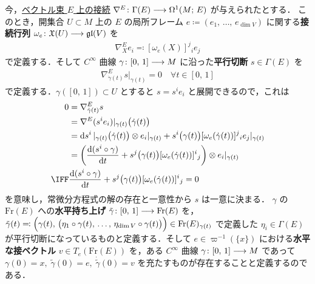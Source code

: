 \documentclass[TQFT_main]{subfiles}
\begin{document}
今，\hyperref[def:connection-vect]{ベクトル束 $E$ 上の接続} $\nabla^E \colon \Gamma(E) \longrightarrow \Omega^1(M;\, E)$ が与えられたとする．
このとき，開集合 $U \subset M$ 上の $E$ の局所フレーム $e \coloneqq (e_1,\, \dots,\, e_{\dim V})$ に関する\textbf{接続行列} $\omega_e \colon \mathfrak{X}(U) \longrightarrow \mathfrak{gl}(V)$ を
\begin{align}
    \nabla^E_{X} e_i \eqqcolon [\omega_e (X)]^j{}_i e_j
\end{align}
で定義する．そして $C^\infty$ 曲線 $\gamma \colon [0,\, 1] \longrightarrow M$ に沿った\textbf{平行切断} $s \in \Gamma(E)$ を
\begin{align}
    \nabla^E_{\dot{\gamma}(t)} s|_{\gamma(t)} = 0 \quad \forall t \in [0,\, 1]
\end{align}
で定義する．$\gamma([0,\, 1]) \subset U$ とすると $s = s^i e_i$ と展開できるので，これは
\begin{align}
    0 &= \nabla^E_{\dot{\gamma}(t)} s \\
    &= \nabla^E (s^ie_i)|_{\gamma(t)} \bigl( \dot{\gamma}(t) \bigr) \\
    &= \dd{s^i}|_{\gamma(t)}\bigl( \dot{\gamma}(t) \bigr) \otimes e_i|_{\gamma(t)} + s^i \bigl( \gamma(t) \bigr) [\omega_e (\dot{\gamma}(t))]^j{}_i e_j|_{\gamma(t)} \\
    &= \left( \dv{(s^i \circ \gamma)}{t} + s^j\bigl( \gamma(t) \bigr) [\omega_e (\dot{\gamma}(t))]^i{}_j \right) \otimes e_i|_{\gamma(t)} \\
    \IFF &\dv{(s^i \circ \gamma)}{t} + s^j\bigl( \gamma(t) \bigr) [\omega_e (\dot{\gamma}(t))]^i{}_j = 0
\end{align}
を意味し，常微分方程式の解の存在と一意性から $s$ は一意に決まる．
$\gamma$ の $\mathrm{Fr}(E)$ への\textbf{水平持ち上げ} $\tilde{\gamma} \colon [0,\, 1] \longrightarrow \mathrm{Fr}(E)$ を，$\tilde{\gamma}(t) \eqqcolon \Bigl( \gamma(t),\, \bigl(\eta_1 \circ \gamma(t),\, \dots,\, \eta_{\dim V} \circ \gamma(t)\bigr) \Bigr) \in \mathrm{Fr}(E)_{\gamma(t)} $ で定義した $\eta_i \in \Gamma(E)$ 
が平行切断になっているものと定義する．そして $e \in \varpi^{-1}(\{x\})$ における\textbf{水平な接ベクトル} $v \in T_{e} (\mathrm{Fr}(E))$ を，ある $C^\infty$ 曲線 $\gamma \colon [0,\, 1] \longrightarrow M$ であって $\gamma(0) = x,\; \tilde{\gamma}(0) = e,\;  \dot{\tilde{\gamma}}(0) = v$ を充たすものが存在することと定義するのである．
\end{document}
